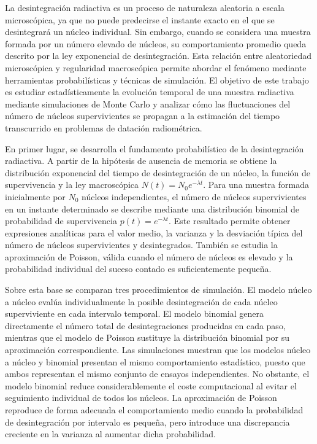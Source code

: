 \documentclass[12pt,a4paper]{article}
\begin{document}
La desintegración radiactiva es un proceso de naturaleza aleatoria a escala microscópica, ya que no puede predecirse el instante exacto en el que se desintegrará un núcleo individual. Sin embargo, cuando se considera una muestra formada por un número elevado de núcleos, su comportamiento promedio queda descrito por la ley exponencial de desintegración. Esta relación entre aleatoriedad microscópica y regularidad macroscópica permite abordar el fenómeno mediante herramientas probabilísticas y técnicas de simulación. El objetivo de este trabajo es estudiar estadísticamente la evolución temporal de una muestra radiactiva mediante simulaciones de Monte Carlo y analizar cómo las fluctuaciones del número de núcleos supervivientes se propagan a la estimación del tiempo transcurrido en problemas de datación radiométrica.

En primer lugar, se desarrolla el fundamento probabilístico de la desintegración radiactiva. A partir de la hipótesis de ausencia de memoria se obtiene la distribución exponencial del tiempo de desintegración de un núcleo, la función de supervivencia y la ley macroscópica $N(t)=N_0e^{-\lambda t}$. Para una muestra formada inicialmente por $N_0$ núcleos independientes, el número de núcleos supervivientes en un instante determinado se describe mediante una distribución binomial de probabilidad de supervivencia $p(t)=e^{-\lambda t}$. Este resultado permite obtener expresiones analíticas para el valor medio, la varianza y la desviación típica del número de núcleos supervivientes y desintegrados. También se estudia la aproximación de Poisson, válida cuando el número de núcleos es elevado y la probabilidad individual del suceso contado es suficientemente pequeña.

Sobre esta base se comparan tres procedimientos de simulación. El modelo núcleo a núcleo evalúa individualmente la posible desintegración de cada núcleo superviviente en cada intervalo temporal. El modelo binomial genera directamente el número total de desintegraciones producidas en cada paso, mientras que el modelo de Poisson sustituye la distribución binomial por su aproximación correspondiente. Las simulaciones muestran que los modelos núcleo a núcleo y binomial presentan el mismo comportamiento estadístico, puesto que ambos representan el mismo conjunto de ensayos independientes. No obstante, el modelo binomial reduce considerablemente el coste computacional al evitar el seguimiento individual de todos los núcleos. La aproximación de Poisson reproduce de forma adecuada el comportamiento medio cuando la probabilidad de desintegración por intervalo es pequeña, pero introduce una discrepancia creciente en la varianza al aumentar dicha probabilidad.
\end{document}
